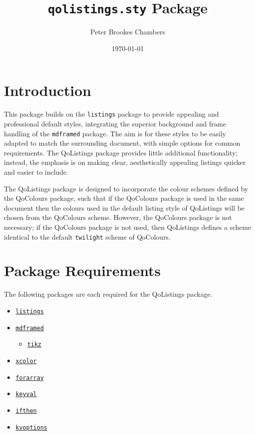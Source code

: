 \documentclass{article}
\title{\texttt{qolistings.sty} Package}
\author{Peter Brookes Chambers}
\date{\today{}}
\newcommand{\ttt}[1]{\texttt{#1}}
\begin{document}
\maketitle
\clearpage
\tableofcontents{}
\clearpage
{}

\section{Introduction}

This package builds on the \ttt{listings} package to provide appealing and professional default styles, integrating the superior background and frame handling of the \ttt{mdframed} package. The aim is for these styles to be easily adapted to match the surrounding document, with simple options for common requirements. The QoListings package provides little additional functionality; instead, the emphasis is on making clear, aesthetically appealing listings quicker and easier to include.

The QoListings package is designed to incorporate the colour schemes defined by the QoColours package, such that if the QoColours package is used in the same document then the colours used in the default listing style of QoListings will be chosen from the QoColours scheme. However, the QoColours package is not necessary; if the QoColours package is not used, then QoListings defines a scheme identical to the default \ttt{twilight} scheme of QoColours.

\section{Package Requirements}

The following packages are each required for the QoListings package.

\begin{itemize}
    \item \href{https://ctan.org/pkg/listings}{\ttt{listings}}
    \item \href{https://ctan.org/pkg/mdframed}{\ttt{mdframed}}
    \begin{itemize}
        \item \href{https://ctan.org/pkg/pgf}{\ttt{tikz}}
    \end{itemize}
    \item \href{https://ctan.org/pkg/xcolor}{\ttt{xcolor}}
    \item \href{https://ctan.org/pkg/forarray}{\ttt{forarray}}
    \item \href{https://ctan.org/pkg/keyval}{\ttt{keyval}}
    \item \href{https://ctan.org/pkg/ifthen}{\ttt{ifthen}}
    \item \href{https://ctan.org/pkg/kvoptions}{\ttt{kvoptions}}
\end{itemize}
\end{document}
